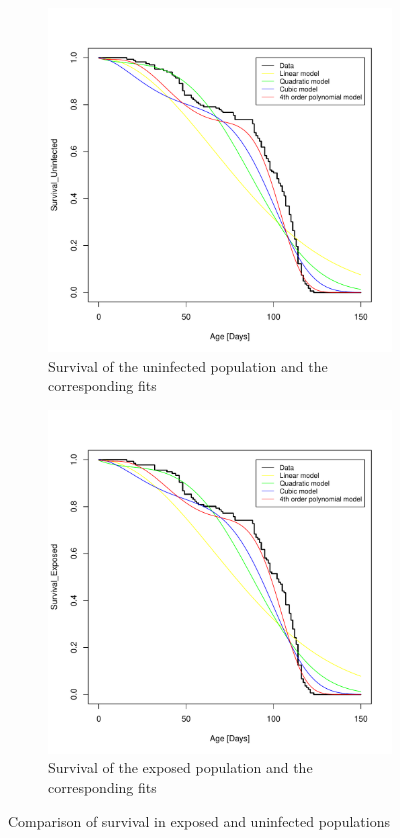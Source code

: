 \documentclass[10pt]{article}         %
\begin{document}
\begin{figure}[H]
\begin{subfigure}[b]{0.6\textwidth}
    \includegraphics[width=\textwidth]{uninfected_population_survival_and_fit.pdf}
    \caption{Survival of the uninfected population and the corresponding fits}
    \label{fig:subfigure_exp}
  \end{subfigure}
  \begin{subfigure}[b]{0.6\textwidth}
    \includegraphics[width=\textwidth]{exposed_population_survival_and_fit.pdf}
    \caption{Survival of the exposed population and the corresponding fits}
    \label{fig:subfigure_uninfected}
  \end{subfigure}
  \caption{Comparison of survival in exposed and uninfected populations}
  \label{survivals_exp_uninfected}
\end{figure}
\end{document}
